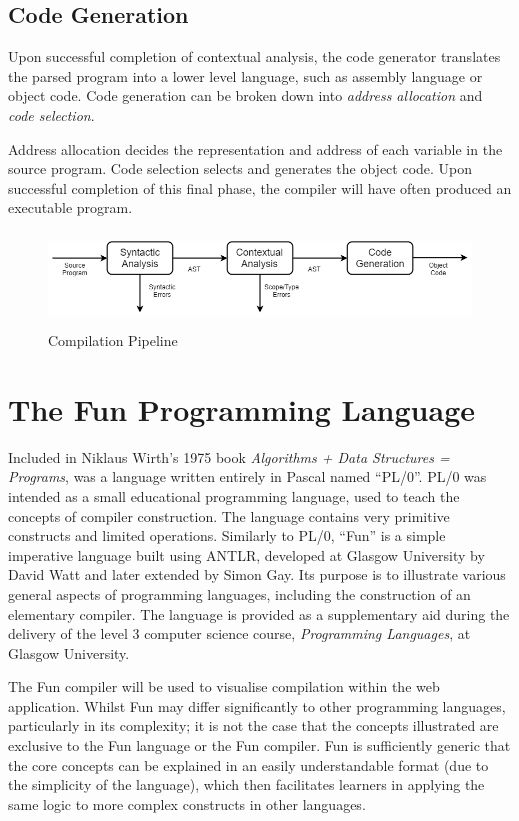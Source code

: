 \documentclass{l4proj}
\begin{document}
\subsection{Code Generation}
Upon successful completion of contextual analysis, the code generator translates the parsed program into a lower level language, such as assembly language or object code. Code generation can be broken down into \textit{address allocation} and \textit{code selection}.

Address allocation decides the representation and address of each variable in the source program. Code selection selects and generates the object code. Upon successful completion of this final phase, the compiler will have often produced an executable program.

\begin{figure}[h]
\centering
\includegraphics[height=2.5cm,width=13cm]{images/3-2a.png}
\caption{Compilation Pipeline}
\label{fig:compilation-pipeline}	
\end{figure}

\section{The Fun Programming Language}
Included in Niklaus Wirth's 1975 book {\it Algorithms + Data Structures = Programs}, was a language written entirely in Pascal named ``PL/0''. PL/0 was intended as a small educational programming language, used to teach the concepts of compiler construction. The language contains very primitive constructs and limited operations. Similarly to PL/0, ``Fun'' is a simple imperative language built using ANTLR, developed at Glasgow University by David Watt and later extended by Simon Gay. Its purpose is to illustrate various general aspects of programming languages, including the construction of an elementary compiler. The language is provided as a supplementary aid during the delivery of the level 3 computer science course, {\it Programming Languages}, at Glasgow University.

The Fun compiler will be used to visualise compilation within the web application. Whilst Fun may differ significantly to other programming languages, particularly in its complexity; it is not the case that the concepts illustrated are exclusive to the Fun language or the Fun compiler. Fun is sufficiently generic that the core concepts can be explained in an easily understandable format (due to the simplicity of the language), which then facilitates learners in applying the same logic to more complex constructs in other languages.
\end{document}
